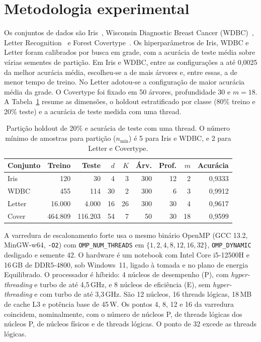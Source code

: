 \documentclass[12pt]{article}
\begin{document}
\section{Metodologia experimental}
\label{sec:met}

Os conjuntos de dados são Iris~\cite{fisher:1936}, Wisconsin Diagnostic Breast Cancer
(WDBC)~\cite{street:1993}, Letter Recognition~\cite{frey:1991} e Forest
Covertype~\cite{blackard:1999}. Os hiperparâmetros de Iris, WDBC e Letter foram
calibrados por busca em grade, com a acurácia de teste média sobre várias sementes
de partição. Em Iris e WDBC, entre as configurações a até 0{,}0025 da melhor
acurácia média, escolheu-se a de mais árvores e, entre essas, a de menor tempo de
treino. No Letter adotou-se a configuração de maior acurácia média da grade. O
Covertype foi fixado em 50 árvores, profundidade 30 e $m = 18$. A
Tabela~\ref{tab:config} resume as dimensões, o holdout estratificado por classe
(80\% treino e 20\% teste) e a acurácia de teste medida com uma thread.

\begin{table}[!htbp]
\centering
\caption{Partição holdout de 20\% e acurácia de teste com uma thread. O número
mínimo de amostras para partição ($n_{\min}$) é 5 para Iris e WDBC, e 2 para
Letter e Covertype.}
\label{tab:config}
\footnotesize
\setlength{\tabcolsep}{4pt}
\begin{tabular}{@{}lrrrrrrrr@{}}
\toprule
Conjunto & Treino & Teste & $d$ & $K$ & Árv. & Prof. & $m$ & Acurácia \\
\midrule
Iris     & 120      & 30       & 4  & 3  & 300 & 12 & 2  & 0{,}9333 \\
WDBC     & 455      & 114      & 30 & 2  & 300 & 6  & 3  & 0{,}9912 \\
Letter   & 16{.}000 & 4{.}000  & 16 & 26 & 300 & 30 & 4  & 0{,}9617 \\
Cover    & 464{.}809 & 116{.}203 & 54 & 7 & 50 & 30 & 18 & 0{,}9599 \\
\bottomrule
\end{tabular}
\end{table}

A varredura de escalonamento forte usa o mesmo binário OpenMP (GCC 13.2,
MinGW-w64, \texttt{-O2}) com \texttt{OMP\_NUM\_THREADS} em
$\{1, 2, 4, 8, 12, 16, 32\}$, \texttt{OMP\_DYNAMIC} desligado e semente 42. O
hardware é um notebook com Intel Core i5-12500H e 16\,GB de DDR5-4800, sob
Windows~11, ligado à tomada e no plano de energia Equilibrado. O processador é
híbrido: 4 núcleos de desempenho (P), com \textit{hyper-threading} e turbo de até
4{,}5\,GHz, e 8 núcleos de eficiência (E), sem \textit{hyper-threading} e com turbo
de até 3{,}3\,GHz. São 12 núcleos, 16 threads lógicas, 18\,MB de cache L3 e
potência base de 45\,W. Os pontos 4, 8, 12 e 16 da varredura coincidem, nominalmente, com o
número de núcleos P, de threads lógicas dos núcleos P, de núcleos físicos e de
threads lógicas. O ponto de 32 excede as threads lógicas.
\end{document}
